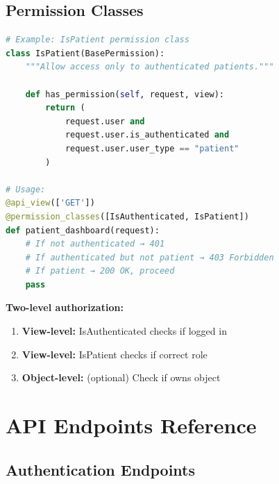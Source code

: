 \documentclass[11pt,a4paper,twoside]{report}
\begin{document}
\section{Permission Classes}

\begin{lstlisting}[language=Python]
# Example: IsPatient permission class
class IsPatient(BasePermission):
    """Allow access only to authenticated patients."""
    
    def has_permission(self, request, view):
        return (
            request.user and 
            request.user.is_authenticated and 
            request.user.user_type == "patient"
        )

# Usage:
@api_view(['GET'])
@permission_classes([IsAuthenticated, IsPatient])
def patient_dashboard(request):
    # If not authenticated → 401
    # If authenticated but not patient → 403 Forbidden
    # If patient → 200 OK, proceed
    pass
\end{lstlisting}

\textbf{Two-level authorization:}
\begin{enumerate}
    \item \textbf{View-level:} IsAuthenticated checks if logged in
    \item \textbf{View-level:} IsPatient checks if correct role
    \item \textbf{Object-level:} (optional) Check if owns object
\end{enumerate}

\newpage

\chapter{API Endpoints Reference}

\section{Authentication Endpoints}
\end{document}
